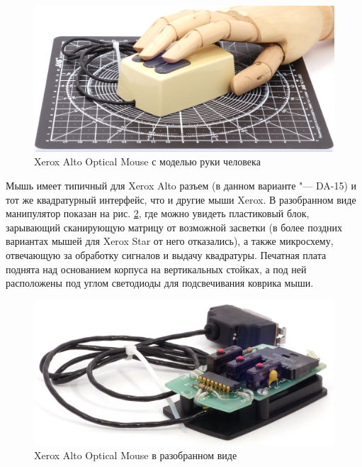 \documentclass[11pt, a4paper]{article}
\begin{document}
\begin{figure}[h]
    \centering
    \includegraphics[scale=0.45]{1981_xerox_alto_mouse/hand_30.jpg}
    \caption{Xerox Alto Optical Mouse с моделью руки человека}
    \label{fig:XeroxAltoHand}
\end{figure}

Мышь имеет типичный для Xerox Alto разъем (в данном варианте "--- DA-15) и тот же квадратурный интерфейс, что и другие мыши Xerox. В разобранном виде манипулятор показан на рис. \ref{fig:XeroxAltoInside}, где можно увидеть пластиковый блок, зарывающий сканирующую матрицу от возможной засветки (в более поздних вариантах мышей для Xerox Star от него отказались), а также микросхему, отвечающую за обработку сигналов и выдачу квадратуры. Печатная плата поднята над основанием корпуса на вертикальных стойках, а под ней расположены под углом светодиоды для подсвечивания коврика мыши.

\begin{figure}[h]
    \centering
    \includegraphics[scale=0.9]{1981_xerox_alto_mouse/inside_60.jpg}
    \caption{Xerox Alto Optical Mouse в разобранном виде}
    \label{fig:XeroxAltoInside}
\end{figure}
\end{document}
